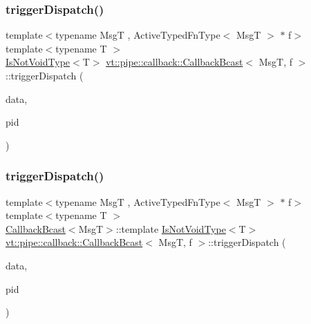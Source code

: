 \subsubsection{\texorpdfstring{trigger\+Dispatch()}{triggerDispatch()}\hspace{0.1cm}{\footnotesize\ttfamily [3/4]}}
{\footnotesize\ttfamily template$<$typename MsgT , Active\+Typed\+Fn\+Type$<$ Msg\+T $>$ $\ast$ f$>$ \\
template$<$typename T $>$ \\
\hyperlink{structvt_1_1pipe_1_1callback_1_1_callback_bcast_a3f5efa2edf7f4c47fe047e086e63a477}{Is\+Not\+Void\+Type}$<$T$>$ \hyperlink{structvt_1_1pipe_1_1callback_1_1_callback_bcast}{vt\+::pipe\+::callback\+::\+Callback\+Bcast}$<$ MsgT, f $>$\+::trigger\+Dispatch (\begin{DoxyParamCaption}\item[{\hyperlink{structvt_1_1pipe_1_1callback_1_1_callback_bcast_aaf994b71056001334d30d74fa9c958f9}{Signal\+Data\+Type} $\ast$}]{data,  }\item[{\hyperlink{namespacevt_ac9852acda74d1896f48f406cd72c7bd3}{Pipe\+Type} const \&}]{pid }\end{DoxyParamCaption})\hspace{0.3cm}{\ttfamily [private]}}

\mbox{\label{structvt_1_1pipe_1_1callback_1_1_callback_bcast_a20640706bfaf002e19d6e085200bd7b8}} 
\subsubsection{\texorpdfstring{trigger\+Dispatch()}{triggerDispatch()}\hspace{0.1cm}{\footnotesize\ttfamily [4/4]}}
{\footnotesize\ttfamily template$<$typename MsgT , Active\+Typed\+Fn\+Type$<$ Msg\+T $>$ $\ast$ f$>$ \\
template$<$typename T $>$ \\
\hyperlink{structvt_1_1pipe_1_1callback_1_1_callback_bcast}{Callback\+Bcast}$<$MsgT$>$\+::template \hyperlink{structvt_1_1pipe_1_1callback_1_1_callback_bcast_a3f5efa2edf7f4c47fe047e086e63a477}{Is\+Not\+Void\+Type}$<$T$>$ \hyperlink{structvt_1_1pipe_1_1callback_1_1_callback_bcast}{vt\+::pipe\+::callback\+::\+Callback\+Bcast}$<$ MsgT, f $>$\+::trigger\+Dispatch (\begin{DoxyParamCaption}\item[{\hyperlink{structvt_1_1pipe_1_1callback_1_1_callback_bcast_aaf994b71056001334d30d74fa9c958f9}{Signal\+Data\+Type} $\ast$}]{data,  }\item[{\mbox{[}\mbox{[}maybe\+\_\+unused\mbox{]} \mbox{]} \hyperlink{namespacevt_ac9852acda74d1896f48f406cd72c7bd3}{Pipe\+Type} const \&}]{pid }\end{DoxyParamCaption})}



